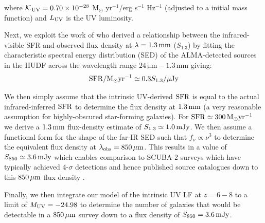 \documentclass[fleqn,usenatbib]{mnras}
\begin{document}
\noindent
where $\cal{K}$$_{\rm UV} = 0.70 \times 10^{-28}$ M$_{\odot}$ yr$^{-1}$/erg s$^{-1}$ Hz$^{-1}$ (adjusted to a \citet{chabrier2003} initial mass function) and $L_{\rm UV}$ is the UV luminosity. 

Next, we exploit the work of \citet{dunlop2017} who derived a relationship between the infrared-visible SFR and observed flux density at $\lambda = 1.3 \rm \, mm$ ($S_{1.3}$) by fitting the characteristic spectral energy distribution (SED) of the ALMA-detected sources in the HUDF across the wavelength range $24 \,\mathrm{\mu m}-1.3 \,\mathrm{mm}$ giving:
\begin{equation}
    \mathrm{SFR / M_{\odot}yr^{-1}} \simeq 0.3 S_{1.3}/ \mu \rm Jy 
\end{equation}

We then simply assume that the intrinsic UV-derived $\rm SFR$ is equal to the actual infrared-inferred $\rm SFR$ to determine the flux density at $1.3\, \rm mm$ (a very reasonable assumption for highly-obscured star-forming galaxies). For $\mathrm{SFR}\simeq300\, \rm M_{\odot} yr^{-1}$ we derive a $1.3\, \rm mm$ flux-density estimate of $S_{1.3}\simeq 1.0\, \rm mJy$. We then assume a functional form for the shape of the far-IR SED such that $f_{\nu} \propto \nu^3$ to determine the equivalent flux density at $\lambda_{\rm obs}= 850\, \rm \mu m$. This results in a value of $S_{850}\simeq 3.6\, \rm mJy$ which enables comparison to SCUBA-2 surveys which have typically achieved 4-$\sigma$ detections and hence published source catalogues down to this $850\, \rm \mu m$ flux density \citep[e.g. S2COSMOS, AS2UDS;][]{simpson2019,dudzeviciute2020}.

Finally, we then integrate our model of the intrinsic UV LF at $z=6-8$ to a limit of $M_{\rm UV}=-24.98$ to determine the number of galaxies that would be detectable in a $850\, \rm \mu m$ survey down to a flux density of $S_{850}=3.6\, \rm mJy$. 
\end{document}
